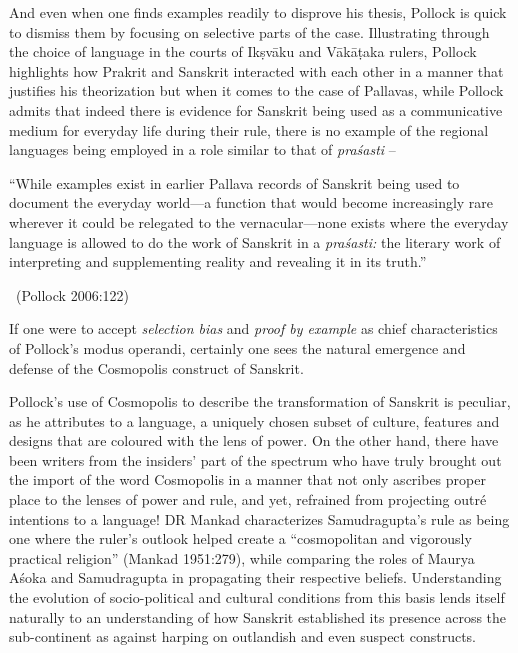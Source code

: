 And even when one finds examples readily to disprove his thesis, Pollock is quick to dismiss them by focusing on selective parts of the case. Illustrating through the choice of language in the courts of Ikṣvāku and Vākāṭaka rulers, Pollock highlights how Prakrit and Sanskrit interacted with each other in a manner that justifies his theorization but when it comes to the case of Pallavas, while Pollock admits that indeed there is evidence for Sanskrit being used as a communicative medium for everyday life during their rule, there is no example of the regional languages being employed in a role similar to that of \textit{praśasti} –

\begin{myquote}
“While examples exist in earlier Pallava records of Sanskrit being used to document the everyday world—a function that would become increasingly rare wherever it could be relegated to the vernacular—none exists where the everyday language is allowed to do the work of Sanskrit in a \textit{praśasti:} the literary work of interpreting and supplementing reality and revealing it in its truth.” 

~\hfill (Pollock 2006:122)
\end{myquote}

If one were to accept \textit{selection bias} and \textit{proof by example} as chief characteristics of Pollock’s modus operandi, certainly one sees the natural emergence and defense of the Cosmopolis construct of Sanskrit.

Pollock’s use of Cosmopolis to describe the transformation of Sanskrit is peculiar, as he attributes to a language, a uniquely chosen subset of culture, features and designs that are coloured with the lens of power. On the other hand, there have been writers from the insiders’ part of the spectrum who have truly brought out the import of the word Cosmopolis in a manner that not only ascribes proper place to the lenses of power and rule, and yet, refrained from projecting outré intentions to a language! DR Mankad characterizes Samudragupta’s rule as being one where the ruler’s outlook helped create a “cosmopolitan and vigorously practical religion” (Mankad 1951:279), while comparing the roles of Maurya Aśoka and Samudragupta in propagating their respective beliefs. Understanding the evolution of socio-political and cultural conditions from this basis lends itself naturally to an understanding of how Sanskrit established its presence across the sub-continent as against harping on outlandish and even suspect constructs.


